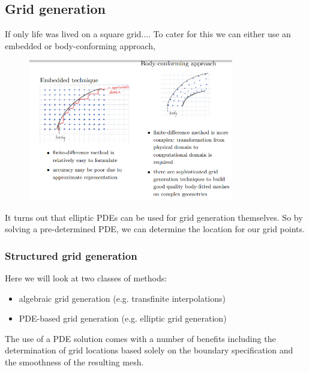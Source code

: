 \documentclass[11pt,a4paper]{report}
\theoremstyle{definition}
\begin{document}
\subsection{Grid generation}
If only life was lived on a square grid.... To cater for this we can either use an embedded or body-conforming approach,
\begin{figure}[!h]
	\centering
	\includegraphics[width=0.8\textwidth]{gridgen.png}
\end{figure}
It turns out that elliptic PDEs can be used for grid generation themselves. So by solving a pre-determined PDE, we can determine the location for our grid points.

\subsubsection{Structured grid generation}
Here we will look at two classes of methods:
\begin{itemize}
	\item algebraic grid generation (e.g. transfinite interpolations) 
	\item PDE-based grid generation (e.g. elliptic grid generation)
\end{itemize}

The use of a PDE solution comes with a number of benefits including the determination of grid locations based solely on the boundary specification and the smoothness of the resulting mesh.
\end{document}
